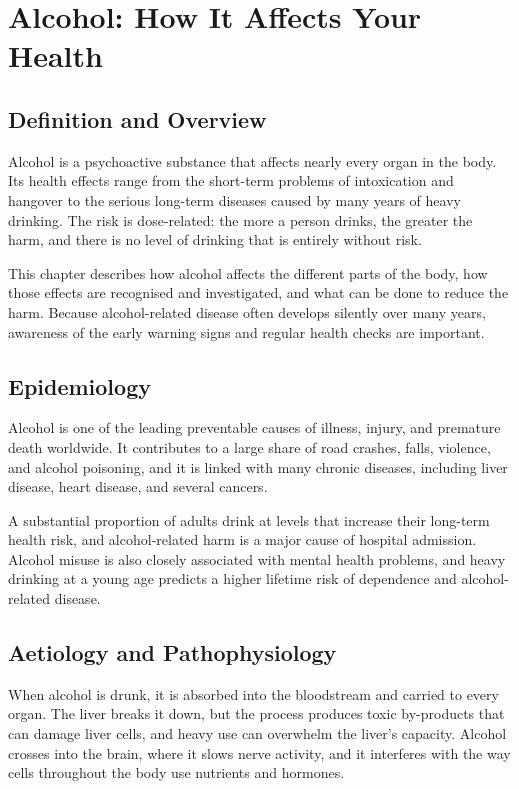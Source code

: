 \chapter{Alcohol: How It Affects Your Health}

\section*{Definition and Overview}
Alcohol is a psychoactive substance that affects nearly every organ in the body. Its health effects range from the short-term problems of intoxication and hangover to the serious long-term diseases caused by many years of heavy drinking. The risk is dose-related: the more a person drinks, the greater the harm, and there is no level of drinking that is entirely without risk.

This chapter describes how alcohol affects the different parts of the body, how those effects are recognised and investigated, and what can be done to reduce the harm. Because alcohol-related disease often develops silently over many years, awareness of the early warning signs and regular health checks are important.

\section*{Epidemiology}
Alcohol is one of the leading preventable causes of illness, injury, and premature death worldwide. It contributes to a large share of road crashes, falls, violence, and alcohol poisoning, and it is linked with many chronic diseases, including liver disease, heart disease, and several cancers.

A substantial proportion of adults drink at levels that increase their long-term health risk, and alcohol-related harm is a major cause of hospital admission. Alcohol misuse is also closely associated with mental health problems, and heavy drinking at a young age predicts a higher lifetime risk of dependence and alcohol-related disease.

\section*{Aetiology and Pathophysiology}
When alcohol is drunk, it is absorbed into the bloodstream and carried to every organ. The liver breaks it down, but the process produces toxic by-products that can damage liver cells, and heavy use can overwhelm the liver's capacity. Alcohol crosses into the brain, where it slows nerve activity, and it interferes with the way cells throughout the body use nutrients and hormones.

